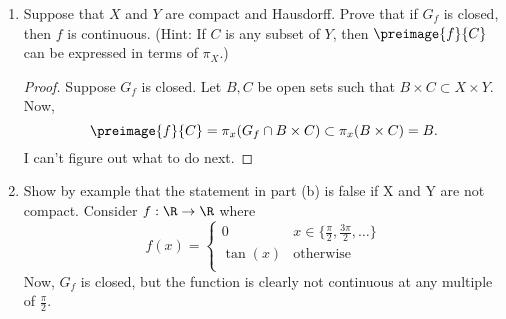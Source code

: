 \documentclass[letterpaper]{article}
\begin{document}
\begin{enumerate}
\begin{enumerate}
\item Suppose that $X$ and $Y$ are compact and Hausdorff. Prove that if $G_f$ is closed, then $f$ is continuous. (Hint: If $C$ is any subset of $Y$, then $\preimage{f}{C}$ can be expressed in terms of $\pi_X$.) 
\begin{proof}
Suppose $G_f$ is closed. Let $B, C$ be open sets such that $B\times C \subset X\times Y$. %
Now, $$\preimage{f}{C}=\pi_x(G_f\cap B\times C)\subset\pi_x(B\times C)=B.$$
I can't figure out what to do next.
\end{proof}

\item Show by example that the statement in part (b) is false if X and Y are not compact.
Consider $f:\R\to\R$ where 
$$f(x)=
\begin{cases}
0 & x\in \{\frac{\pi}{2}, \frac{3\pi}{2}, \ldots\}\\
\tan(x) & \text{otherwise}\\
\end{cases}
$$
Now, $G_f$ is closed, but the function is clearly not continuous at any multiple of $\frac{\pi}{2}$. 
\end{enumerate}



\end{enumerate}
\end{document}
